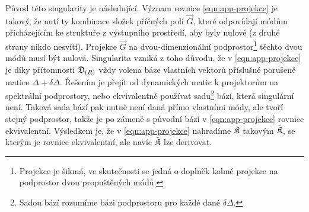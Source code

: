 Původ této singularity je následující.
Význam rovnice \eqref{eqn:app-projekce} je takový, že nutí ty kombinace složek příčných polí $\vec{G}$, které odpovídají módům přicházejícím ke struktuře z výstupního prostředí, aby byly nulové (z druhé strany nikdo nesvítí).
Projekce $\vec{G}$ na dvou-dimenzionální podprostor\footnote{Projekce je šikmá, ve skutečnosti se jedná o doplněk kolmé projekce na podprostor dvou propuštěných módů.} těchto dvou módů musí být nulová.
Singularita vzniká z toho důvodu, že v \eqref{eqn:app-projekce} je díky přítomnosti $\mathfrak{D}_{(R)}$ vždy volena báze vlastních vektorů příslušné porušené matice $\Delta+\delta\Delta$.
Řešením je přejít od dynamických matic k projektorům na spektrální podprostory, nebo ekvivalentně používat sadu\footnote{Sadou bází rozumíme bázi podprostoru pro každé dané $\delta\Delta$.} bází, která singulární není.
Taková sada bází pak nutně není daná přímo vlastními módy, ale tvoří stejný podprostor, takže je po zámeně s původní bází v \eqref{eqn:app-projekce} rovnice ekvivalentní.
Výsledkem je, že v \eqref{eqn:app-projekce} nahradíme $\mathfrak{K}$ takovým $\tilde{\mathfrak{K}}$, se kterým je rovnice ekvivalentní, ale navíc $\tilde{\mathfrak{K}}$ lze derivovat.

